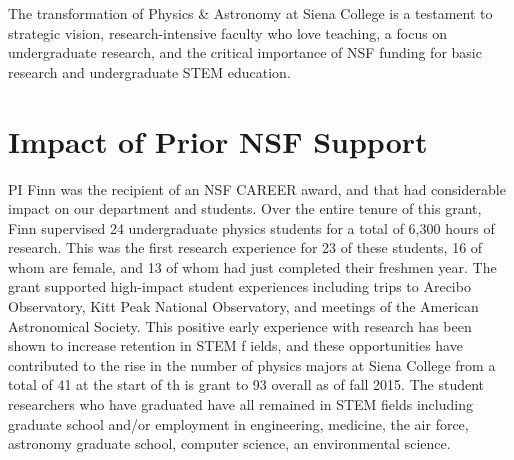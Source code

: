 \documentclass[11pt, preprint]{aastex}
\begin{document}


The transformation of Physics \& Astronomy at Siena College is a testament to
strategic vision, research-intensive faculty who love teaching, a focus on
undergraduate research, and the critical importance of NSF funding for basic
research and undergraduate STEM education.


\section{Impact of Prior NSF Support}

PI Finn was the recipient of an NSF CAREER award, and that had
considerable impact on our department and students.
Over the entire tenure of this grant, Finn supervised 24 undergraduate
physics students for a total of 6,300 hours of research.  This was the
first research experience for 23 of these students, 16 of whom are
female, and 13 of whom had just completed their freshmen year.  
The grant supported high-impact student experiences including trips to
Arecibo Observatory, Kitt Peak National Observatory, and meetings of
the American Astronomical Society.
This
positive early experience with research has been shown to increase
retention in STEM f ields, and these opportunities have contributed to
the rise in the number of physics majors at Siena College from a total
of 41 at the start of th is grant to 93 overall as of fall 2015.  The
student researchers who have graduated have all remained in STEM
fields including graduate school and/or employment in engineering, medicine, the air force, astronomy graduate school, computer
science, an environmental science.
\end{document}

